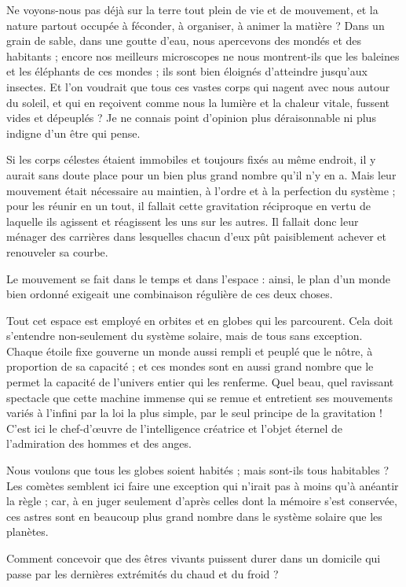 \documentclass[a4paper, 11pt, oneside]{article}
\begin{document}
Ne voyons-nous pas déjà sur la terre tout plein de vie et de mouvement, et la nature partout occupée à féconder, à organiser, à animer la matière ? Dans un grain de sable, dans une goutte d'eau, nous apercevons des mondés et des habitants ; encore nos meilleurs microscopes ne nous montrent-ils que les baleines et les éléphants de ces mondes ; ils sont bien éloignés d'atteindre jusqu'aux insectes. Et l'on voudrait que tous ces vastes corps qui nagent avec nous autour du soleil, et qui en reçoivent comme nous la lumière et la chaleur vitale, fussent vides et dépeuplés ? Je ne connais point d'opinion plus déraisonnable ni plus indigne d'un être qui pense.

Si les corps célestes étaient immobiles et toujours fixés au même endroit, il y aurait sans doute place pour un bien plus grand nombre qu'il n'y en a. Mais leur mouvement était nécessaire au maintien, à l'ordre et à la perfection du système ; pour les réunir en un tout, il fallait cette gravitation réciproque en vertu de laquelle ils agissent et réagissent les uns sur les autres. Il fallait donc leur ménager des carrières dans lesquelles chacun d'eux pût paisiblement achever et renouveler sa courbe.

Le mouvement se fait dans le temps et dans l'espace : ainsi, le plan d'un monde bien ordonné exigeait une combinaison régulière de ces deux choses.

Tout cet espace est employé en orbites et en globes qui les parcourent. Cela doit s'entendre non-seulement du système solaire, mais de tous sans exception. Chaque étoile fixe gouverne un monde aussi rempli et peuplé que le nôtre, à proportion de sa capacité ; et ces mondes sont en aussi grand nombre que le permet la capacité de l'univers entier qui les renferme. Quel beau, quel ravissant spectacle que cette machine immense qui se remue et entretient ses mouvements variés à l'infini par la loi la plus simple, par le seul principe de la gravitation ! C'est ici le chef-d'œuvre de l'intelligence créatrice et l'objet éternel de l'admiration des hommes et des anges.

Nous voulons que tous les globes soient habités ; mais sont-ils tous habitables ? Les comètes semblent ici faire une exception qui n'irait pas à moins qu'à anéantir la règle ; car, à en juger seulement d'après celles dont la mémoire s'est conservée, ces astres sont en beaucoup plus grand nombre dans le système solaire que les planètes.

Comment concevoir que des êtres vivants puissent durer dans un domicile qui passe par les dernières extrémités du chaud et du froid ?
\end{document}
